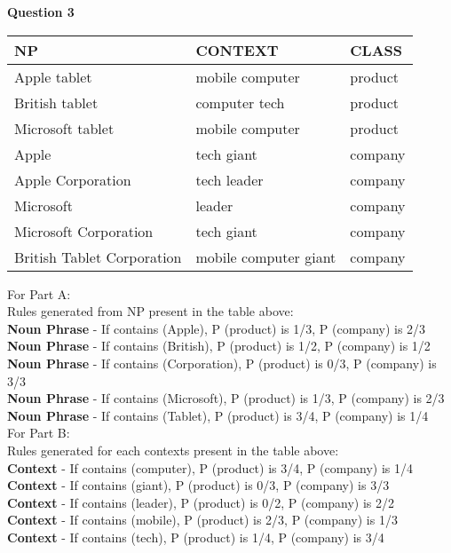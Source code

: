 \documentclass[11pt]{article}
\begin{document}
\begin{enumerate}
\begin{enumerate}
\end{enumerate}


\newpage
{\bf Question 3}
\begin{center}
\begin{tabular}{|lll|} \hline
\textbf{NP}  & \textbf{CONTEXT} & \textbf{CLASS} \\ \hline
Apple tablet          & mobile computer & {\sc product} \\
British tablet        & computer tech & {\sc product} \\
Microsoft tablet      & mobile computer  & {\sc product} \\
Apple                 & tech giant  & {\sc company} \\
Apple Corporation     & tech leader  & {\sc company} \\
Microsoft             &  leader & {\sc company} \\
Microsoft Corporation & tech giant  & {\sc company} \\
British Tablet Corporation & mobile computer giant & {\sc company} \\ \hline
\end{tabular}
\end{center}

For Part A:\\
Rules generated from NP present in the table above:\\

{\bf Noun Phrase} - If contains (Apple), P (product) is 1/3, P (company) is 2/3\\  
{\bf Noun Phrase} - If contains (British), P (product) is 1/2, P (company) is 1/2\\
{\bf Noun Phrase} - If contains (Corporation), P (product) is 0/3, P (company) is 3/3\\
{\bf Noun Phrase} - If contains (Microsoft), P (product) is 1/3, P (company) is 2/3\\
{\bf Noun Phrase} - If contains (Tablet), P (product) is 3/4, P (company) is 1/4\\

For Part B:\\
Rules generated for each contexts present in the table above:\\

{\bf Context} - If contains (computer), P (product) is 3/4, P (company) is 1/4\\  
{\bf Context} - If contains (giant), P (product) is 0/3, P (company) is 3/3\\
{\bf Context} - If contains (leader), P (product) is 0/2, P (company) is 2/2\\
{\bf Context} - If contains (mobile), P (product) is 2/3, P (company) is 1/3\\
{\bf Context} - If contains (tech), P (product) is 1/4, P (company) is 3/4\\



\end{enumerate}
\end{document}
